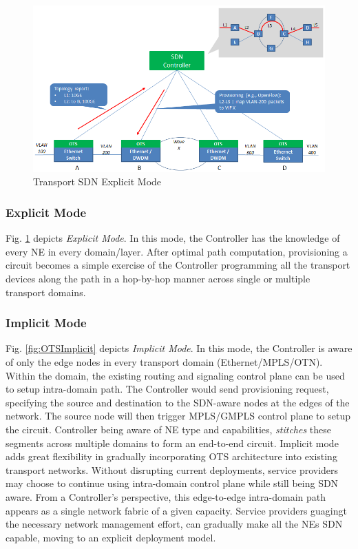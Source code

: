 \documentclass{sig-alternate-10pt}
\begin{document}
	\begin{figure}[htb]
	\centering
	\includegraphics[scale=0.37]{OTSExplicit.png}
	\caption{Transport SDN Explicit Mode}
	\label{fig:OTSExplicit}
	\end{figure}

	\subsubsection{Explicit Mode}
	Fig. \ref{fig:OTSExplicit} depicts \textit{Explicit Mode}. In this mode, the Controller has the knowledge
	of every NE in every domain/layer. After optimal path computation, provisioning a circuit becomes a
	simple exercise of the Controller programming all the transport devices along the path in a hop-by-hop
	manner across single or multiple transport domains.
	
	\subsubsection{Implicit Mode} Fig. \ref{fig:OTSImplicit} depicts \textit{Implicit Mode}. In this mode,
	the Controller is aware of only the edge nodes in every transport domain (Ethernet/MPLS/OTN). Within the
	domain, the existing routing and signaling control plane can be used to setup intra-domain path. The
	Controller would send provisioning request, specifying the source and destination to the SDN-aware nodes
	at the edges of the network. The source node will then trigger MPLS/GMPLS control plane to setup the circuit.
	Controller being aware of NE type and capabilities, \textit{stitches} these segments across multiple
	domains to form an end-to-end circuit. Implicit mode adds great flexibility in gradually incorporating
	OTS architecture into existing transport networks. Without disrupting current deployments, service
	providers may choose to continue using intra-domain control plane while still being SDN aware. From a
	Controller's perspective, this edge-to-edge intra-domain path appears as a single network fabric of a
	given capacity. Service providers guagingt the necessary network management effort, can gradually make
	all the NEs SDN capable, moving to an explicit deployment model.
\end{document}
